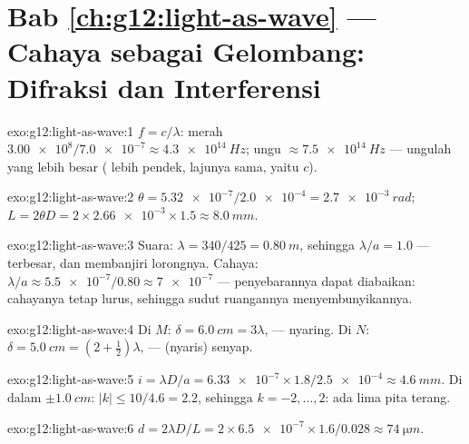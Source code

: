 \section*{Bab \ref{ch:g12:light-as-wave} --- Cahaya sebagai Gelombang: Difraksi dan Interferensi}

\begin{solution}{exo:g12:light-as-wave:1}
$f = c/\lambda$: merah $\num{3.00e8}/\num{7.0e-7} \approx
\qty{4.3e14}{Hz}$; ungu $\approx \qty{7.5e14}{Hz}$ --- ungulah yang
lebih besar ( lebih pendek, lajunya sama, yaitu $c$).
\end{solution}

\begin{solution}{exo:g12:light-as-wave:2}
$\theta = \num{5.32e-7}/\num{2.0e-4} = \qty{2.7e-3}{rad}$;
$L = 2\theta D = 2 \times \num{2.66e-3} \times 1.5 \approx
\qty{8.0}{mm}$.
\end{solution}

\begin{solution}{exo:g12:light-as-wave:3}
Suara: $\lambda = 340/425 = \qty{0.80}{m}$, sehingga $\lambda/a = 1.0$
---  terbesar, dan  membanjiri lorongnya. Cahaya:
$\lambda/a \approx \num{5.5e-7}/0.80 \approx \num{7e-7}$ ---
penyebarannya dapat diabaikan: cahayanya tetap lurus, sehingga sudut
ruangannya menyembunyikannya.
\end{solution}

\begin{solution}{exo:g12:light-as-wave:4}
Di $M$: $\delta = \qty{6.0}{cm} = 3\lambda$,  --- nyaring.
Di $N$: $\delta = \qty{5.0}{cm} = (2 + \tfrac12)\lambda$,  ---
(nyaris) senyap.
\end{solution}

\begin{solution}{exo:g12:light-as-wave:5}
$i = \lambda D/a = \num{6.33e-7} \times 1.8/\num{2.5e-4} \approx
\qty{4.6}{mm}$. Di dalam $\pm\qty{1.0}{cm}$: $|k| \leq 10/4.6 = 2.2$,
sehingga $k = -2, \dots, 2$: ada lima pita terang.
\end{solution}

\begin{solution}{exo:g12:light-as-wave:6}
$d = 2\lambda D/L = 2 \times \num{6.5e-7} \times 1.6/0.028 \approx
\qty{74}{\micro m}$.
\end{solution}

